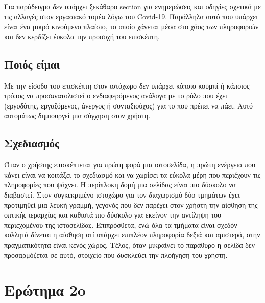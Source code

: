\documentclass[12pt]{article}
\begin{document}
Για παράδειγμα δεν υπάρχει ξεκάθαρο \textlatin{section} για ενημερώσεις και οδηγίες σχετικά με τις αλλαγές στον εργασιακό τομέα λόγω του \textlatin{Covid-19}. Παράλληλα αυτό που υπάρχει είναι ένα μικρό κινούμενο πλαίσιο, το οποίο χάνεται μέσα στο χάος των πληροφοριών και δεν κερδίζει έυκολα την προσοχή του επισκέπτη.

\subsection{Ποιός είμαι}
Με την είσοδο του επισκέπτη στον ιστόχωρο δεν υπάρχει κόποιο κουμπί ή κάποιος τρόπος να  προσανατολιστεί ο ενδιαφερόμενος ανάλογα με το ρόλο που έχει (εργοδότης, εργαζόμενος, άνεργος ή συνταξιούχος) για το που πρέπει να πάει. Αυτό αυτομάτως δημιουργεί μια σύγχηση στον χρήστη.

\subsection{Σχεδιασμός}
Όταν ο χρήστης επισκέπτεται για πρώτη φορά μια ιστοσελίδα, η πρώτη ενέργεια που κάνει είναι να κοιτάξει το σχεδιασμό και να χωρίσει τα εύκολα μέρη που περιέχουν τις  πληροφορίες που ψάχνει. Η περίπλοκη δομή μια σελίδας είναι πιο δύσκολο να διαβαστεί. Στον συγκεκριμένο ιστοχώρο για τον διαχωρισμό δύο τμημάτων έχει προτιμηθεί μια λευκή γραμμή, γεγονός που δεν παρέχει στον χρήστη την αίσθηση της οπτικής ιεραρχίας και καθιστά πιο δύσκολο για εκείνον την αντίληψη του περιεχομένου της ιστοσελίδας. Επιπρόσθετα, ενώ όλα τα τμήματα είναι σχεδόν κολλητά δίνεται η αίσθηση οτί υπάρχει επιπλέον πληροφορία δεξιά και αριστερά, στην πραγματικότητα είναι κενός χώρος. Τέλος, όταν μικραίνει το παράθυρο η σελίδα δεν προσαρμόζεται σε αυτό, στοιχείο που δυσκλεύει την πλοήγηση του χρήστη. 

\section{Ερώτημα 2o}




\newpage


\end{document}

